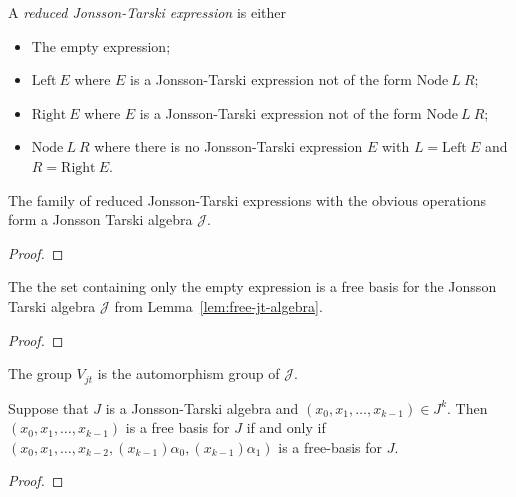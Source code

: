 \begin{definition}\label{def:reduced_jt_expression}
A \emph{reduced Jonsson-Tarski expression} is either
\begin{itemize}
    \item The empty expression;
    \item \(\text{Left}\ E\) where \(E\) is a Jonsson-Tarski expression not of the form $\text{Node}\ L\ R$;
    \item \(\text{Right}\ E\) where \(E\) is a Jonsson-Tarski expression not of the form $\text{Node}\ L\ R$;
    \item \(\text{Node}\ L\ R\) where there is no Jonsson-Tarski expression \(E\) with \(L= \text{Left}\ E\) and \(R= \text{Right}\ E\).
\end{itemize}
\end{definition}
\begin{lemma}\label{lem:free-jt-algebra}
    The family of reduced Jonsson-Tarski expressions with the obvious operations form a Jonsson Tarski algebra \(\mathcal{J}\).
\end{lemma}
    \begin{proof}
    \end{proof}
\begin{lemma}\label{lem:freejt_is_free}
    The the set containing only the empty expression is a free basis for the Jonsson Tarski algebra \(\mathcal{J}\) from Lemma~\ref{lem:free-jt-algebra}.
\end{lemma}\begin{proof}
    \end{proof}

\begin{definition}\label{def:V_jonsson_tarski}
    The group \(V_{jt}\) is the automorphism group of \(\mathcal{J}\).
\end{definition}


\begin{lemma}\label{lem:free_base_manip}
    Suppose that \(J\) is a Jonsson-Tarski algebra and \((x_0, x_1, \ldots, x_{k-1})\in J^k\).
    Then \((x_0, x_1, \ldots, x_{k-1})\) is a free basis for \(J\) if and only if \((x_0, x_1, \ldots, x_{k-2},(x_{k-1})\alpha_0,(x_{k-1})\alpha_1)\) is a free-basis for \(J\).
\end{lemma}
\begin{proof}
\end{proof}

